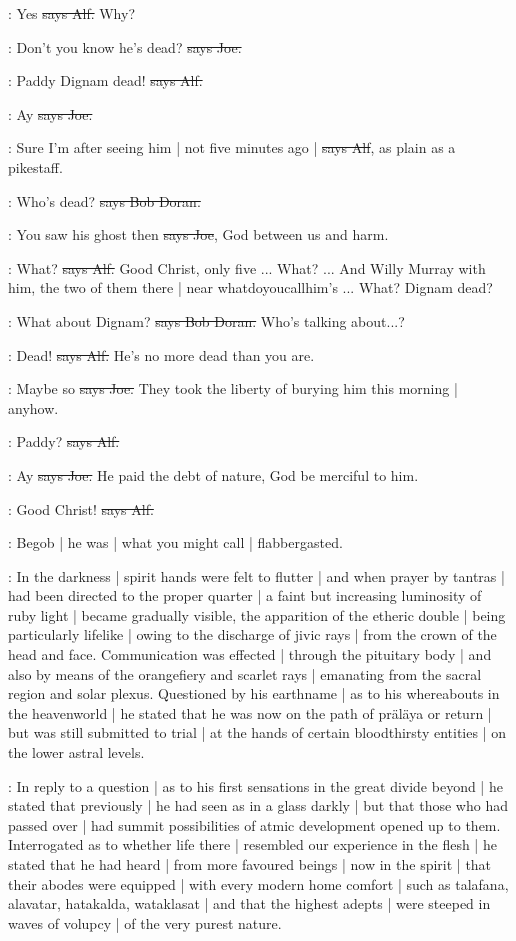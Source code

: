 \bergan:
Yes
\sout{says Alf.}
Why?

\joe:
Don't you know he's dead?
\sout{says Joe.}

\bergan:
Paddy Dignam dead!
\sout{says Alf.}

\joe:
Ay
\sout{says Joe.}

\bergan:
Sure I'm after seeing him |
not five minutes ago |
\sout{says Alf},
as plain as a pikestaff.

\doran:
Who's dead?
\sout{says Bob Doran.}

\joe:
You saw his ghost then
\sout{says Joe},
God between us and harm.

\bergan:
What?
\sout{says Alf.} Good Christ,
only five ...
What?
...
And Willy Murray with him,
the two of them there |
near whatdoyoucallhim's ...
What?
Dignam dead?

\doran:
What about Dignam?
\sout{says Bob Doran.}
Who's talking about...?

\bergan:
Dead!
\sout{says Alf.}
He's no more dead than you are.

\joe:
Maybe so
\sout{says Joe.}
They took the liberty of burying him this morning |
anyhow.

\bergan:
Paddy?
\sout{says Alf.}

\joe:
Ay
\sout{says Joe.}
He paid the debt of nature,
God be merciful to him.

\bergan:
Good Christ!
\sout{says Alf.}

\Nq:
Begob |
he was |
what you might call |
flabbergasted.

:
In the darkness |
spirit hands were felt to flutter |
and when prayer by tantras |
had been directed to the proper quarter |
a faint but increasing luminosity of ruby light |
became gradually visible,
the apparition of the etheric double |
being particularly lifelike |
owing to the discharge of jivic rays |
from the crown of the head and face.
Communication was effected |
through the pituitary body |
and also by means of the orangefiery and scarlet rays |
emanating from the sacral region and solar plexus.
Questioned by his earthname |
as to his whereabouts in the heavenworld |
he stated that he was now on the path of präläya or return |
but was still submitted to trial |
at the hands of certain bloodthirsty entities |
on the lower astral levels.

:
In reply to a question |
as to his first sensations in the great divide beyond |
he stated that previously |
he had seen as in a glass darkly |
but that those who had passed over |
had summit possibilities of atmic development opened up to them.
Interrogated as to whether life there |
resembled our experience in the flesh |
he stated that he had heard |
from more favoured beings |
now in the spirit |
that their abodes were equipped |
with every modern home comfort |
such as talafana,
alavatar,
hatakalda,
wataklasat |
and that the highest adepts |
were steeped in waves of volupcy |
of the very purest nature.

